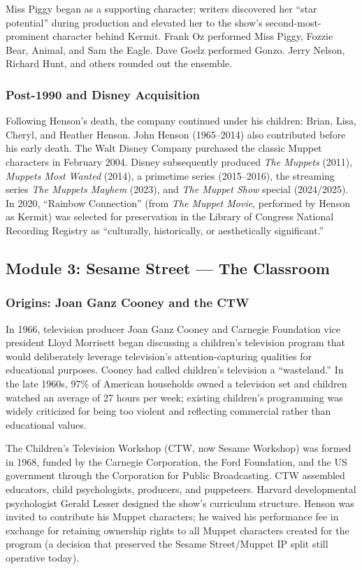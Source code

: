 \documentclass[11pt,letterpaper]{article}
\begin{document}
Miss Piggy began as a supporting character; writers discovered her ``star potential'' during production and elevated her to the show's second-most-prominent character behind Kermit. Frank Oz performed Miss Piggy, Fozzie Bear, Animal, and Sam the Eagle. Dave Goelz performed Gonzo. Jerry Nelson, Richard Hunt, and others rounded out the ensemble.

\subsubsection{Post-1990 and Disney Acquisition}

Following Henson's death, the company continued under his children: Brian, Lisa, Cheryl, and Heather Henson. John Henson (1965--2014) also contributed before his early death. The Walt Disney Company purchased the classic Muppet characters in February 2004. Disney subsequently produced \textit{The Muppets} (2011), \textit{Muppets Most Wanted} (2014), a primetime series (2015--2016), the streaming series \textit{The Muppets Mayhem} (2023), and \textit{The Muppet Show} special (2024/2025). In 2020, ``Rainbow Connection'' (from \textit{The Muppet Movie}, performed by Henson as Kermit) was selected for preservation in the Library of Congress National Recording Registry as ``culturally, historically, or aesthetically significant.''

\subsection{Module 3: Sesame Street --- The Classroom}

\subsubsection{Origins: Joan Ganz Cooney and the CTW}

In 1966, television producer Joan Ganz Cooney and Carnegie Foundation vice president Lloyd Morrisett began discussing a children's television program that would deliberately leverage television's attention-capturing qualities for educational purposes. Cooney had called children's television a ``wasteland.'' In the late 1960s, 97\% of American households owned a television set and children watched an average of 27 hours per week; existing children's programming was widely criticized for being too violent and reflecting commercial rather than educational values.

The Children's Television Workshop (CTW, now Sesame Workshop) was formed in 1968, funded by the Carnegie Corporation, the Ford Foundation, and the US government through the Corporation for Public Broadcasting. CTW assembled educators, child psychologists, producers, and puppeteers. Harvard developmental psychologist Gerald Lesser designed the show's curriculum structure. Henson was invited to contribute his Muppet characters; he waived his performance fee in exchange for retaining ownership rights to all Muppet characters created for the program (a decision that preserved the Sesame Street/Muppet IP split still operative today).
\end{document}
